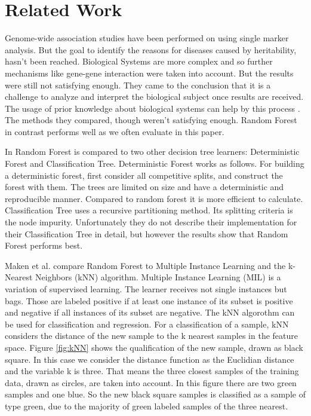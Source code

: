 \documentclass{sig-alternate-05-2015}
\begin{document}
\section{Related Work}
Genome-wide association studies have been performed on using single marker analysis. But the goal to identify the reasons for diseases caused by heritability, hasn't been reached. Biological Systems are more complex and so further mechanisms like gene-gene interaction were taken into account. But the results were still not satisfying enough. They came to the conclusion that it is a  challenge to analyze and interpret the biological subject once results are received. The usage of prior knowledge about biological systems can help by this process \cite{moore2010bioinformatics}. The methods they compared, though weren't satisfying enough. Random Forest in contrast performs well as we often evaluate in this paper.

In \cite{zhang2009willows} Random Forest is compared to two other decision tree learners: Deterministic Forest and Classification Tree.
Deterministic Forest works as follows. For building a deterministic forest, first consider all competitive splits, and construct the forest with them. The trees are limited on size and have a deterministic and reproducible manner. Compared to random forest it is more efficient to calculate. 
Classification Tree uses a recursive partitioning method. Its splitting criteria is the node impurity. Unfortunately they do not describe their implementation for their Classification Tree in detail, but however the results show that Random Forest performs best.

Maken et al. compare \cite{maken2014multiple} Random Forest to Multiple Instance Learning and the k-Nearest Neighbors (kNN)  algorithm. Multiple Instance Learning (MIL) is a variation of supervised learning. The learner receives not single instances but bags. Those are labeled positive if at least one instance of its subset is positive and negative if all instances of its subset are negative. 
The kNN algorothm \cite{Peterson:2009} can be used for classification and regression. For a classification of a sample, kNN considers the distance of the new sample to the k nearest samples in the feature space. Figure \ref{fig:kNN} shows the qualification of the new sample, drawn as black square. In this case we consider the distance function as the Euclidian distance and the variable k is three. That means the three closest samples of the training data, drawn as circles, are taken into account. In this figure there are two green samples and one blue. So the new black square samples is classified as a sample of type green, due to the majority of green labeled samples of the three nearest.
\end{document}
